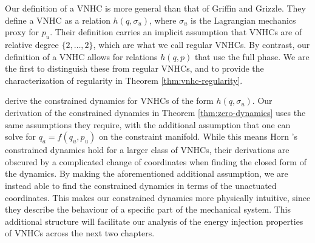 Our definition of a VNHC is more general than that of Griffin and
Grizzle.
They define a VNHC as a relation \(h(q,\sigma_u)\), where \(\sigma_u\) is the
Lagrangian mechanics proxy for \(p_u\).
Their definition carries an implicit assumption that VNHCs are of
relative degree \(\{2,\ldots,2\}\), which are what we call regular VNHCs.
By contrast, our definition of a VNHC allows for relations \(h(q,p)\)
that use the full phase.
We are the first to distinguish these from regular VNHCs, and to
provide the characterization of regularity in Theorem \ref{thm:vnhc-regularity}.

\citet{hybrid_zero_dynamics_bipedal_nhvcs} derive the
constrained dynamics for VNHCs of the form \(h(q,\sigma_u)\).
Our derivation of the constrained dynamics in Theorem
\ref{thm:zero-dynamics} uses the same assumptions they require, with the
additional assumption that one can solve for \(q_a = f(q_u,p_u)\) on the
constraint manifold.
While this means Horn \etal's constrained dynamics hold for a larger class of
VNHCs, their derivations are obscured by a complicated change of coordinates
when finding the closed form of the dynamics. 
By making the aforementioned additional assumption, we are instead able to find
the constrained dynamics in terms of the unactuated coordinates.
This makes our constrained dynamics more physically intuitive, since they
describe the behaviour of a specific part of the mechanical system.
This additional structure will facilitate our analysis of the energy injection
properties of VNHCs across the next two chapters.

